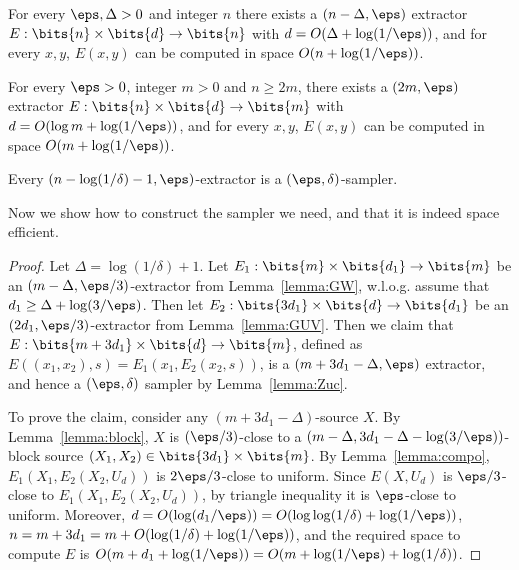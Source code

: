 \begin{lemma}[\cite{GW97}]\label{lemma:GW}
For every $\eps,\Delta>0$ and integer $n$ there exists a $(n-\Delta,\eps)$ extractor $E:\bits{n}\times\bits{d}\to\bits{n}$ with $d=O(\Delta+\log(1/\eps))$, and for every $x,y$, $E(x,y)$ can be computed in space $O(n+\log(1/\eps))$.
\end{lemma}
\begin{lemma}\label{lemma:GUV}
For every $\eps>0$, integer $m>0$ and $n\ge 2m$, there exists a $(2m,\eps)$ extractor $E:\bits{n}\times\bits{d}\to\bits{m}$ with $d=O(\log m + \log(1/\eps))$, and for every $x,y$, $E(x,y)$  can be computed in space $O(m+\log(1/\eps))$.
\end{lemma}
\begin{lemma}\label{lemma:Zuc}
Every $(n-\log(1/\delta)-1,\eps)$-extractor is a $(\eps,\delta)$-sampler.
\end{lemma}
\noindent
Now we show how to construct the sampler we need, and that it is indeed space efficient.
\begin{proof}
Let $\Delta=\log(1/\delta)+1$. Let $E_1:\bits{m}\times\bits{d_1}\to\bits{m}$ be an $(m-\Delta,\eps/3)$-extractor from Lemma~\ref{lemma:GW}, w.l.o.g. assume that $d_1\ge \Delta+\log(3/\eps)$. Then let $E_2:\bits{3d_1}\times\bits{d}\to\bits{d_1}$ be an $(2d_1,\eps/3)$-extractor from Lemma~\ref{lemma:GUV}. Then we claim that $E:\bits{m+3d_1}\times\bits{d}\to\bits{m}$, defined as $E((x_1,x_2),s)=E_1(x_1,E_2(x_2,s))$, is a $(m+3d_1-\Delta,\eps)$ extractor, and hence a $(\eps,\delta)$ sampler by Lemma~\ref{lemma:Zuc}. 

To prove the claim, consider any $(m+3d_1-\Delta)$-source $X$. By Lemma~\ref{lemma:block}, $X$ is $(\eps/3)$-close to a $(m-\Delta,3d_1-\Delta-\log(3/\eps))$-block source $(X_1,X_2)\in\bits{3d_1}\times\bits{m}$. By Lemma~\ref{lemma:compo}, $E_1(X_1,E_2(X_2,U_d))$ is $2\eps/3$-close to uniform. Since $E(X,U_d)$ is $\eps/3$-close to $E_1(X_1,E_2(X_2,U_d))$, by triangle inequality it is $\eps$-close to uniform. Moreover, $d=O(\log (d_1/\eps))=O(\log\log(1/\delta)+\log(1/\eps))$, $n=m+3d_1=m+O(\log(1/\delta)+\log(1/\eps))$, and the required space to compute $E$ is $O(m+d_1+\log(1/\eps))=O(m+\log(1/\eps)+\log(1/\delta))$.
\end{proof}
